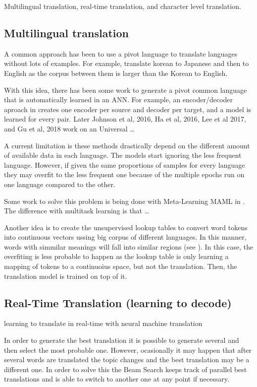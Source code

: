 \documentclass[b5paper]{report}
\begin{document}
Multilingual translation, real-time translation, and character level
translation.

\subsection{Multilingual translation}

A common approach has been to use a pivot language to translate languages
without lots of examples. For example, translate korean to Japanese and then to
English as the corpus between them is larger than the Korean to English.

With this idea, there has been some work to generate a pivot common language
that is automatically learned in an ANN. For example, an encoder/decoder
aproach in \cite{firat2016multi, firat2016zero} creates one encoder per source
and decoder per target, and a model is learned for every pair. Later Johnson et
al, 2016, Ha et al, 2016, Lee et al 2017, and Gu et al, 2018 work on an
Universal \dots

A current limitation is these methods drastically depend on the different
amount of available data in each language. The models start ignoring the less
frequent language. However, if given the same proportions of samples for every
language they may overfit to the less frequent one because of the multiple epochs
run on one language compared to the other.

Some work to solve this problem is being done with Meta-Learning MAML in
\cite{finn2017model}. The difference with multitask learning is that  \dots

Another idea is to create the unsupervised lookup tables to convert word tokens
into continuous vectors ussing big corpus of different languages. In this
manner, words with simmilar meanings will fall into similar regions (see
\cite{artetxe2017unsupervised}). In this case, the overfiting is less probable
to happen as the lookup table is only learning a mapping of tokens to a
continuoius space, but not the translation. Then, the translation model is
trained on top of it.

\subsection{Real-Time Translation (learning to decode)}

learning to translate in real-time with neural machine translation
\cite{gu2016learning}

In order to generate the best translation it is possible to generate several
and then select the most probable one. However, ocasionally it may happen that
after several words are translated the topic changes and the best translation
may be a different one. In order to solve this the Beam Search keeps track of
parallel best translations and is able to switch to another one at any point if
necessary.
\end{document}
